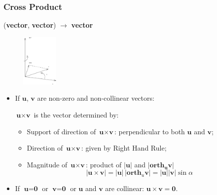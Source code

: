 \begin{frame}
 \frametitle{Cross Product}

\begin{center}
 (\textbf{vector}, \textbf{vector}) $\to$ \textbf{vector}
\end{center}

\begin{figure}[h]
  \includegraphics[height=1in]{../../modules/vectors/pictures/ok-cross_product.eps}
\end{figure}

\begin{itemize}
 \item If $\textbf{u}$, $\textbf{v}$ are non-zero and non-collinear vectors:\\
\begin{center}
 $\textbf{u} \times \textbf{v}$ is the vector determined by:
\end{center}
%
\begin{itemize}
 \item Support of direction of $\textbf{u} \times \textbf{v}$:
perpendicular to both $\textbf{u}$ and $\textbf{v}$;
 \item Direction of $\textbf{u} \times \textbf{v}$: given by Right Hand Rule;
 \item Magnitude of $\textbf{u} \times \textbf{v}$: product of $|\textbf{u}|$ and $|\textbf{orth}_{\bm{u}} \textbf{v}|$
%
$$|\textbf{u} \times \textbf{v}| = |\textbf{u}| \, |\textbf{orth}_u \textbf{v}| = |\textbf{u}| |\textbf{v}| \sin{\alpha}$$
%
\end{itemize}
\item If $\textbf{u}=\textbf{0}$ or $\textbf{v}=\textbf{0}$ or
$\textbf{u}$ and $\textbf{v}$ are collinear: \pause $\textbf{u} \times \textbf{v} = \textbf{0} $.
%
\end{itemize}

\end{frame}